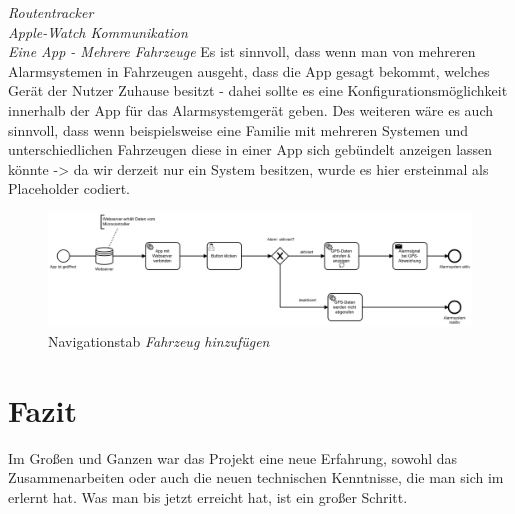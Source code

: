 \textit{Routentracker}
\\
\textit{Apple-Watch Kommunikation}
\\
\textit{Eine App - Mehrere Fahrzeuge}
Es ist sinnvoll, dass wenn man von mehreren Alarmsystemen in Fahrzeugen ausgeht, dass die App gesagt bekommt, welches Gerät der Nutzer Zuhause besitzt - dahei sollte es eine Konfigurationsmöglichkeit innerhalb der App für das Alarmsystemgerät geben. Des weiteren wäre es auch sinnvoll, dass wenn beispielsweise eine Familie mit mehreren Systemen und unterschiedlichen Fahrzeugen diese in einer App sich gebündelt anzeigen lassen könnte -> da wir derzeit nur ein System besitzen, wurde es hier ersteinmal als Placeholder codiert.
\begin{figure} [H]
	\begin{center}
		\includegraphics[width=1\textwidth]{Bilder/iOS_camunda.png}
		\caption{Navigationstab \textit{Fahrzeug hinzufügen}}
		\label{add}
	\end{center}
\end{figure}

\section{Fazit}
Im Großen und Ganzen war das Projekt eine neue Erfahrung, sowohl das Zusammenarbeiten oder auch die neuen technischen Kenntnisse, die man sich im erlernt hat.
Was man bis jetzt erreicht hat, ist ein großer Schritt.